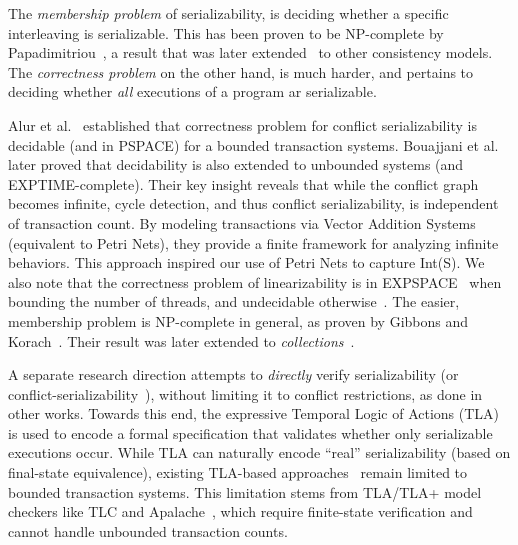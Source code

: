 
The \textit{membership problem} of serializability, is deciding whether a specific interleaving is serializable. This has been proven to be NP-complete by Papadimitriou~\cite{Pa79}, a result that was later extended~\cite{BiEn19} to other consistency models.
%
The \textit{correctness problem} on the other hand, is much harder, and pertains to deciding whether \textit{all} executions of a program ar serializable.

%
Alur et al.~\cite{AlMcPe96} established that correctness problem for conflict serializability is decidable (and in PSPACE) for a bounded transaction systems. Bouajjani et al.~\cite{BoEmEnHa13} later proved that decidability is also extended to unbounded systems (and EXPTIME-complete). Their key insight reveals that while the conflict graph becomes infinite, cycle detection, and thus conflict serializability, is independent of transaction count. By modeling transactions via Vector Addition Systems (equivalent to Petri Nets), they provide a finite framework for analyzing infinite behaviors. This approach inspired our use of Petri Nets to capture Int(S).
%
We also note that the correctness problem of linearizability is in 
EXPSPACE~\cite{AlMcPe96} when bounding the number of threads, and undecidable 
otherwise~\cite{BoEmEnHa13}. The easier, membership problem is NP-complete in 
general, as proven by Gibbons and Korach~\cite{GiKo97}. Their result was later 
extended to \textit{collections}~\cite{EmEn18}.

A separate research direction attempts to \textit{directly} verify serializability (or conflict-serializability~\cite{CoOlPnTuZu07}), without limiting it to conflict restrictions, as done in other works. Towards this end, the expressive Temporal Logic of Actions (TLA)~\cite{La94} is used to encode a formal specification that validates whether only serializable executions occur. While TLA can naturally encode ``real'' serializability (based on final-state equivalence), existing TLA-based approaches~\cite{SoVaVi20, Ho24} remain limited to bounded transaction systems. This limitation stems from TLA/TLA+ model checkers like TLC and Apalache~\cite{YuMaLa99, KoKuTr19}, which require finite-state verification and cannot handle unbounded transaction counts.

